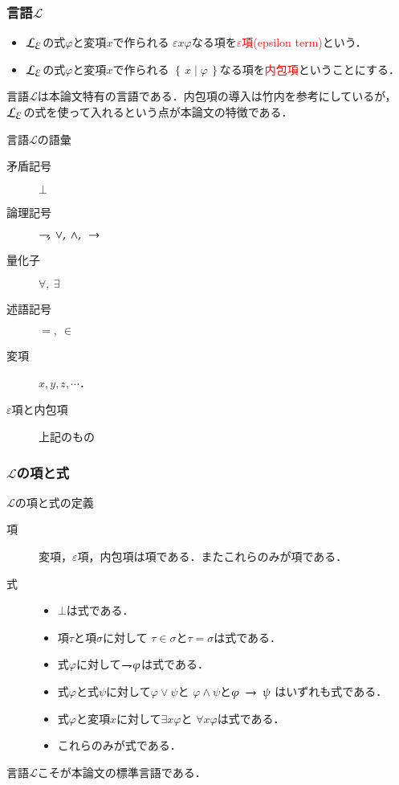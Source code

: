 \documentclass[dvipdfmx,10pt,notheorems]{beamer}
\theoremstyle{definition}
\newcommand{\lang}[1]{\mathcal{L}_{\scalebox{1.2}{$#1$}}} %
\newcommand{\Set}[2]{\left\{\, #1 \mid #2\, \right\}} %
\newcommand{\negation}{\rightharpoondown\hspace{-0.25em}} %
\newcommand{\rarrow}{\hspace{0.25em}\rightarrow\hspace{0.25em}} %
\begin{document}
\begin{frame}\frametitle{言語$\mathcal{L}$}
	\begin{itemize}
		\item $\lang{\varepsilon}$の式$\varphi$と変項$x$で作られる
			$\varepsilon x \varphi$なる項を\textcolor{red}{$\varepsilon$項(epsilon term)}という．
			
		\item $\lang{\varepsilon}$の式$\varphi$と変項$x$で作られる
			$\Set{x}{\varphi}$なる項を\textcolor{red}{内包項}ということにする．
	\end{itemize}
	
	言語$\mathcal{L}$は本論文特有の言語である．内包項の導入は竹内\cite{TakeuchiSet}を参考にしているが，
	$\lang{\varepsilon}$の式を使って入れるという点が本論文の特徴である．
	
	\begin{exampleblock}{言語$\mathcal{L}$の語彙}
		\begin{description}
			\item[矛盾記号] $\bot$
			\item[論理記号] $\negation,\ \vee,\ \wedge,\ \rarrow$
			\item[量化子] $\forall,\ \exists$
			\item[述語記号] $=,\ \in$
			\item[変項] $x,y,z,\cdots$．
			\item[$\varepsilon$項と内包項] 上記のもの 
		\end{description}
	\end{exampleblock}
\end{frame}

\begin{frame}\frametitle{$\mathcal{L}$の項と式}

	\begin{exampleblock}{$\mathcal{L}$の項と式の定義}
		\begin{description}
			\item[項] 変項，$\varepsilon$項，内包項は項である．またこれらのみが項である．
			
			\item[式] 
				\begin{itemize}
					\item $\bot$は式である．
					\item 項$\tau$と項$\sigma$に対して
						$\tau \in \sigma$と$\tau = \sigma$は式である．
					\item 式$\varphi$に対して$\negation \varphi$は式である．
					\item 式$\varphi$と式$\psi$に対して$\varphi \vee \psi$と
						$\varphi \wedge \psi$と$\varphi \rarrow \psi$
						はいずれも式である．
					\item 式$\varphi$と変項$x$に対して$\exists x \varphi$と
						$\forall x \varphi$は式である．
					\item これらのみが式である．
				\end{itemize}
		\end{description}
	\end{exampleblock}
	
	言語$\mathcal{L}$こそが本論文の標準言語である．
	
\end{frame}
\end{document}
